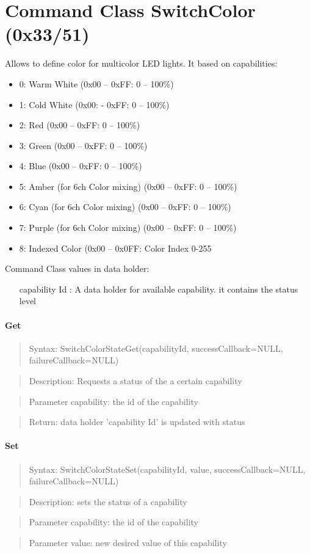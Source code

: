 \section{Command Class SwitchColor (0x33/51)}	

Allows to define color for multicolor LED lights. It based on capabilities:
\begin{itemize}
\item 0: Warm White (0x00 – 0xFF: 0 – 100\%)
\item 1: Cold White (0x00: - 0xFF: 0 – 100\%)
\item 2: Red (0x00 – 0xFF: 0 – 100\%)
\item 3: Green (0x00 – 0xFF: 0 – 100\%)
\item 4: Blue (0x00 – 0xFF: 0 – 100\%)
\item 5: Amber (for 6ch Color mixing) (0x00 – 0xFF: 0 – 100\%)
\item 6: Cyan (for 6ch Color mixing) (0x00 – 0xFF: 0 – 100\%)
\item 7: Purple (for 6ch Color mixing) (0x00 – 0xFF: 0 – 100\%)
\item 8: Indexed Color (0x00 – 0x0FF: Color Index 0-255
\end{itemize}

Command Class values in data holder:
\begin{itemize}
\item [capability Id]: A data holder for available capability. it contains the status level
\end{itemize}

\paragraph {Get}
\begin{quote} Syntax: SwitchColorStateGet(capabilityId, successCallback=NULL, failureCallback=NULL)\end{quote}
\begin{quote} Description: Requests a status of the a certain capability\end{quote}
\begin{quote} Parameter capability: the id of the capability\end{quote}
\begin{quote} Return: data holder 'capability Id' is updated with status \end{quote}

\paragraph {Set}
\begin{quote} Syntax: SwitchColorStateSet(capabilityId, value, successCallback=NULL, failureCallback=NULL)\end{quote}
\begin{quote} Description: sets the status of a capability\end{quote}
\begin{quote} Parameter capability: the id of the capability\end{quote}
\begin{quote} Parameter value: new desired value of this capability\end{quote}

